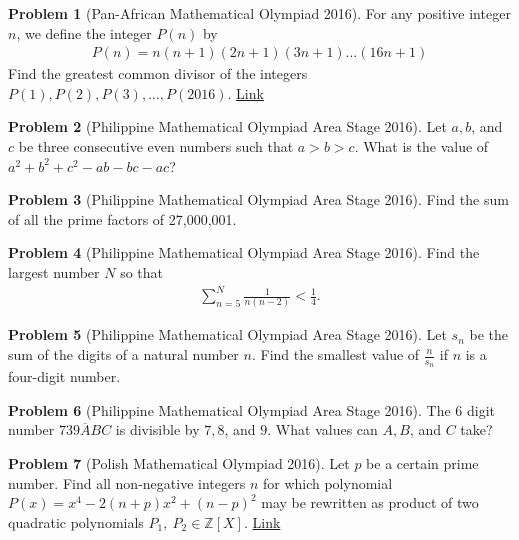 \documentclass[]{article}
\theoremstyle{definition}
\newtheorem{problem}{Problem}
\begin{document}
\begin{problem}[Pan-African Mathematical Olympiad 2016]
	For any positive integer $n$, we define the integer $P(n)$ by
		\begin{align*}
				P(n)=n(n+1)(2n+1)(3n+1)\dots(16n+1)
		\end{align*}
	Find the greatest common divisor of the integers $P(1), P(2), P(3),\dots,P(2016)$. \hfill \href{http://artofproblemsolving.com/community/c6h1235286p6271340}{Link}
\end{problem}



\begin{problem}[Philippine Mathematical Olympiad Area Stage 2016]
	Let $a, b$, and $c$ be three consecutive even numbers such that $a > b > c$. What is the value of $a^2 + b^2 + c^2 - ab - bc - ac$?
\end{problem}




\begin{problem}[Philippine Mathematical Olympiad Area Stage 2016]
	Find the sum of all the prime factors of 27,000,001.
\end{problem}



\begin{problem}[Philippine Mathematical Olympiad Area Stage 2016]
	Find the largest number $N$ so that
		\begin{align*}
			\sum_{n=5}^{N} \frac{1}{n(n-2)} < \frac{1}{4}.
		\end{align*}
\end{problem}


\begin{problem}[Philippine Mathematical Olympiad Area Stage 2016]
	Let $s_n$ be the sum of the digits of a natural number $n$. Find the smallest value of $\frac{n}{s_n}$ if $n$ is a four-digit number.
\end{problem}



\begin{problem}[Philippine Mathematical Olympiad Area Stage 2016]
	The $6$ digit number $\overline{739ABC}$ is divisible by $7, 8$, and $9$. What values can $A, B$, and $C$ take?
\end{problem}

\begin{problem}[Polish Mathematical Olympiad 2016]
	Let $p$ be a certain prime number. Find all non-negative integers $n$ for which polynomial $P(x)=x^4-2(n+p)x^2+(n-p)^2$ may be rewritten as product of two quadratic polynomials $P_1, \ P_2 \in \mathbb{Z}[X]$. \hfill \href{http://artofproblemsolving.com/community/c6h1224662p6149472}{Link}
\end{problem}
\end{document}

